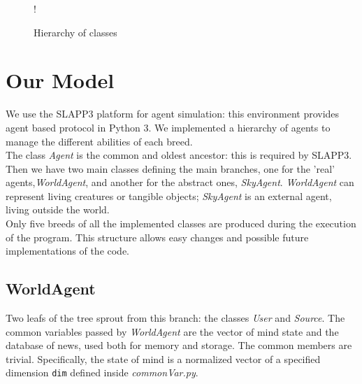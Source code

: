 \begin{figure}
  \begin{center}
     {!} {
    }
  \end{center}
  \caption{Hierarchy of classes}
  \label{fig:hierarchy}
\end{figure}
\section{Our Model}
We use the SLAPP3 platform for agent simulation: this environment provides agent
based protocol in Python 3.
We implemented a hierarchy of agents to manage the different abilities of
each breed.
\\
The class \textit{Agent} is the common and oldest ancestor:
this is required by SLAPP3.\\
Then we have two main classes defining the main branches,
one for the 'real' agents,\textit{WorldAgent}, and another for
the abstract ones, \textit{SkyAgent}.
\textit{WorldAgent} can represent living creatures or tangible objects;
\textit{SkyAgent} is an external agent, living outside the world.\\
Only five breeds of all the implemented classes are produced during
the execution of the program.
This structure allows easy changes and possible future implementations
of the code.

\subsection{WorldAgent}
Two leafs of the tree sprout from this branch: the classes \textit{User}
and \textit{Source}.
The common variables passed by \textit{WorldAgent} are
the vector of mind state and the database of news, used both for memory
and storage. The common members are trivial.
Specifically, the state of mind is a normalized vector of a
specified dimension \texttt{dim} defined inside
\textit{commonVar.py}.

